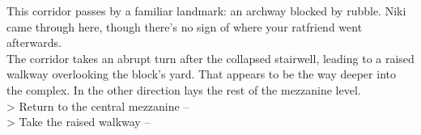 This corridor passes by a familiar landmark: an archway blocked by rubble. Niki came through here, though there’s no sign of where your ratfriend went afterwards.\\

The corridor takes an abrupt turn after the collapsed stairwell, leading to a raised walkway overlooking the block’s yard. That appears to be the way deeper into the complex. In the other direction lays the rest of the mezzanine level.\\

> Return to the central mezzanine -- \\
> Take the raised walkway -- 